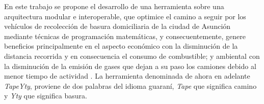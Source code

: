 \documentclass[conference,compsoc]{IEEEtran}
\begin{document}
En este trabajo se propone el desarrollo de una herramienta sobre una arquitectura modular e interoperable, que optimice el camino a seguir por los vehículos de recolección de basura domiciliaria de la ciudad de Asunción mediante técnicas de programación matemáticas, y consecuentemente, genere beneficios principalmente en el aspecto económico con la disminución de la distancia recorrida y en consecuencia el consumo de combustible; y ambiental con la disminución de la emisión de gases que dejan a su paso los camiones debido al menor tiempo de actividad \cite{Vu2018ParameterModel}. La herramienta denominada de ahora en adelante \textit{TapeYty}, proviene de dos palabras del idioma guaraní, \textit{Tape} que significa camino y \textit{Yty} que significa basura.


\end{document}
